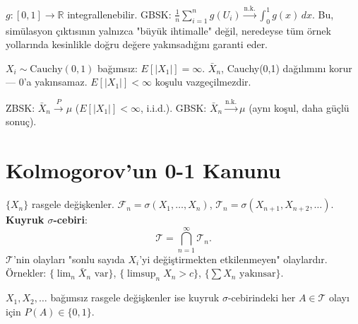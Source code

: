 \begin{ornek}
$g : [0,1] \to \mathbb{R}$ integrallenebilir. GBSK:
$\frac{1}{n}\sum_{i=1}^n g(U_i) \xrightarrow{\text{n.k.}} \int_0^1 g(x)\,dx$.
Bu, simülasyon çıktısının yalnızca "büyük ihtimalle" değil,
neredeyse tüm örnek yollarında kesinlikle doğru değere yakınsadığını garanti eder.
\end{ornek}

\begin{karsiornek}
$X_i \sim \mathrm{Cauchy}(0,1)$ bağımsız: $E[|X_1|] = \infty$.
$\bar{X}_n$, Cauchy(0,1) dağılımını korur --- $0$'a yakınsamaz.
$E[|X_1|] < \infty$ koşulu vazgeçilmezdir.
\end{karsiornek}

\begin{mikroozet}
ZBSK: $\bar{X}_n \xrightarrow{P} \mu$ ($E[|X_1|] < \infty$, i.i.d.).
GBSK: $\bar{X}_n \xrightarrow{\text{n.k.}} \mu$ (aynı koşul, daha güçlü sonuç).
\end{mikroozet}

\section{Kolmogorov'un 0-1 Kanunu}
\label{sec:01_kanunu}

\begin{tanim}
\label{def:kuyruk_sigma}
$\{X_n\}$ rasgele değişkenler. $\mathcal{F}_n = \sigma(X_1, \ldots, X_n)$,
$\mathcal{T}_n = \sigma(X_{n+1}, X_{n+2}, \ldots)$. \textbf{Kuyruk $\sigma$-cebiri}:
\[
  \mathcal{T} = \bigcap_{n=1}^\infty \mathcal{T}_n.
\]
$\mathcal{T}$'nin olayları "sonlu sayıda $X_i$'yi değiştirmekten etkilenmeyen" olaylardır.
Örnekler: $\{\lim_n \bar{X}_n \text{ var}\}$, $\{\limsup_n X_n > c\}$, $\{\sum X_n \text{ yakınsar}\}$.
\end{tanim}

\begin{teorem}
\label{thm:01_kanunu}
$X_1, X_2, \ldots$ bağımsız rasgele değişkenler ise kuyruk $\sigma$-cebirindeki
her $A \in \mathcal{T}$ olayı için $P(A) \in \{0, 1\}$.
\end{teorem}

